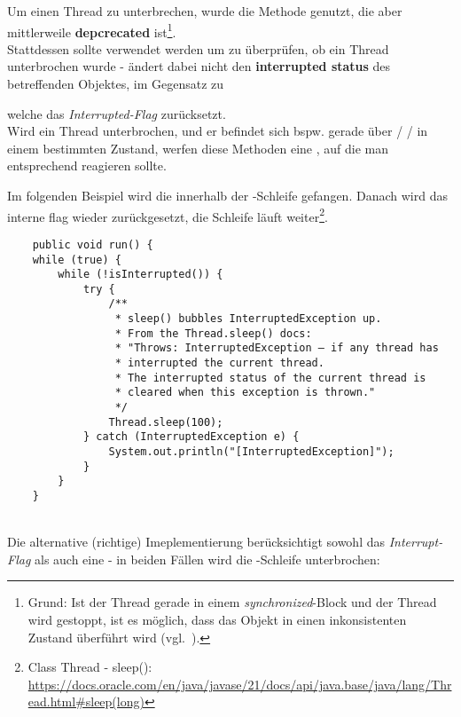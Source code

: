 Um einen Thread zu unterbrechen, wurde die Methode  genutzt, die aber mittlerweile \textbf{depcrecated} ist\footnote{
Grund: Ist der Thread gerade in einem \textit{synchronized}-Block und der Thread wird gestoppt, ist es möglich, dass das Objekt in einen inkonsistenten Zustand überführt wird (vgl.~\cite[40]{Oec22}).
}.\\
Stattdessen sollte  verwendet werden um zu überprüfen, ob ein Thread unterbrochen wurde -  ändert dabei nicht den \textbf{interrupted status} des betreffenden Objektes, im Gegensatz zu
\begin{center}
\end{center}
welche das \textit{Interrupted-Flag} zurücksetzt.\\

Wird ein Thread unterbrochen, und er befindet sich bspw. gerade über  /  /  in einem bestimmten Zustand, werfen diese Methoden eine , auf die man entsprechend reagieren sollte.

\newpage

Im folgenden Beispiel wird die  innerhalb der -Schleife gefangen. Danach wird
das interne flag wieder zurückgesetzt, die Schleife läuft weiter\footnote{
    Class Thread - sleep(): \url{https://docs.oracle.com/en/java/javase/21/docs/api/java.base/java/lang/Thread.html#sleep(long)}
}.
\begin{verbatim}
    public void run() {
    while (true) {
        while (!isInterrupted()) {
            try {
                /**
                 * sleep() bubbles InterruptedException up.
                 * From the Thread.sleep() docs:
                 * "Throws: InterruptedException – if any thread has
                 * interrupted the current thread.
                 * The interrupted status of the current thread is
                 * cleared when this exception is thrown."
                 */
                Thread.sleep(100);
            } catch (InterruptedException e) {
                System.out.println("[InterruptedException]");
            }
        }
    }
\end{verbatim}\\

Die alternative (richtige) Imeplementierung berücksichtigt sowohl das \textit{Interrupt-Flag} als auch eine  - in beiden Fällen wird die -Schleife unterbrochen:

